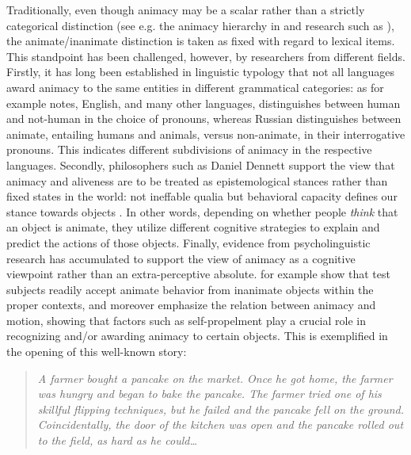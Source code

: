 \documentclass[a4paper,UKenglish]{oasics}
\begin{document}
Traditionally, even though animacy may be a scalar rather than a
strictly categorical distinction (see e.g. the animacy hierarchy in
\cite{comrie:89} and research such as \cite{rosenbach:08}), the
animate/inanimate distinction is taken as fixed with regard to lexical
items. This standpoint has been challenged, however, by researchers
from different fields. Firstly, it has long been established in
linguistic typology that not all languages award animacy to the same
entities in different grammatical categories: as \cite{comrie:89} for
example notes, English, and many other languages, distinguishes
between human and not-human in the choice of pronouns, whereas Russian
distinguishes between animate, entailing humans and animals, versus
non-animate, in their interrogative pronouns. This indicates different
subdivisions of animacy in the respective languages. Secondly,
philosophers such as Daniel Dennett support the view that animacy and
aliveness are to be treated as epistemological stances rather than
fixed states in the world: not ineffable qualia but behavioral
capacity defines our stance towards objects \cite{dennett:96}. In
other words, depending on whether people \textit{think} that an object
is animate, they utilize different cognitive strategies to explain and
predict the actions of those objects. Finally, evidence from
psycholinguistic research has accumulated to support the view of
animacy as a cognitive viewpoint rather than an extra-perceptive
absolute. \cite{nieuwland:05} for example show that test subjects
readily accept animate behavior from inanimate objects within the
proper contexts, and \cite{vogels:13} moreover emphasize the relation
between animacy and motion, showing that factors such as
self-propelment play a crucial role in recognizing and/or awarding
animacy to certain objects. This is exemplified in the opening of this
well-known story:

\begin{quotation} {\it A farmer bought a pancake on the market. Once
    he got home, the farmer was hungry and began to bake the
    pancake. The farmer tried one of his skillful flipping techniques,
    but he failed and the pancake fell on the ground. Coincidentally,
    the door of the kitchen was open and the pancake rolled out to the
    field, as hard as he could\ldots}
\end{quotation}
\end{document}
